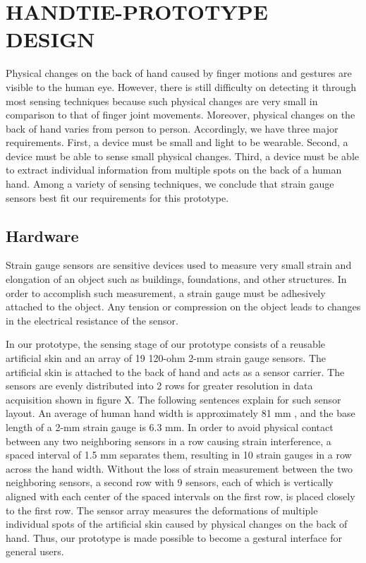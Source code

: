 \documentclass{sigchi}
\begin{document}
\section{HANDTIE-PROTOTYPE DESIGN}

Physical changes on the back of hand caused by finger motions and gestures are visible to the human eye. However, there is still difficulty on detecting it through most sensing techniques because such physical changes are very small in comparison to that of finger joint movements. Moreover, physical changes on the back of hand varies from person to person. Accordingly, we have three major requirements. First, a device must be small and light to be wearable. Second, a device must be able to sense small physical changes. Third, a device must be able to extract individual information from multiple spots on the back of a human hand. Among a variety of sensing techniques, we conclude that strain gauge sensors best fit our requirements for this prototype.

\subsection{Hardware} 
Strain gauge sensors are sensitive devices used to measure very small strain and elongation of an object such as buildings, foundations, and other structures. In order to accomplish such measurement, a strain gauge must be adhesively attached to the object. Any tension or compression on the object leads to changes in the electrical resistance of the sensor.



In our prototype, the sensing stage of our prototype consists of a reusable artificial skin and an array of 19 120-ohm 2-mm strain gauge sensors. The artificial skin is attached to the back of hand and acts as a sensor carrier. The sensors are evenly distributed into 2 rows for greater resolution in data acquisition shown in figure X. The following sentences explain for such sensor layout. An average of human hand width is approximately 81 mm \cite{Kulaksiz2002257}, and the base length of a 2-mm strain gauge is 6.3 mm. In order to avoid physical contact between any two neighboring sensors in a row causing strain interference, a spaced interval of 1.5 mm separates them, resulting in 10 strain gauges in a row across the hand width. Without the loss of strain measurement between the two neighboring sensors, a second row with 9 sensors, each of which is vertically aligned with each center of the spaced intervals on the first row, is placed closely to the first row. The sensor array measures the deformations of multiple individual spots of the artificial skin caused by physical changes on the back of hand. Thus, our prototype is made possible to become a gestural interface for general users.
\end{document}
